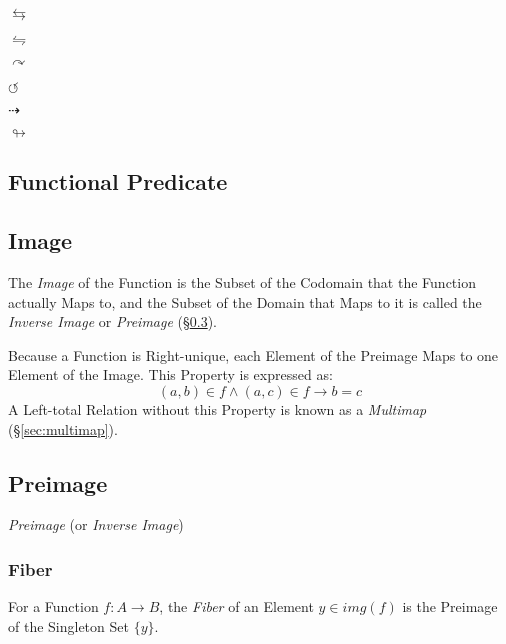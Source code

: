 $\leftrightarrows$

$\leftrightharpoons$

$\curvearrowright$

$\circlearrowleft$

$\dashrightarrow$

$\looparrowright$



\subsection{Functional Predicate}\label{sec:functional_predicate}

\subsection{Image}\label{sec:image}

The \emph{Image} of the Function is the Subset of the Codomain that
the Function actually Maps to, and the Subset of the Domain that Maps
to it is called the \emph{Inverse Image} or \emph{Preimage}
(\S\ref{sec:preimage}).

Because a Function is Right-unique, each Element of the Preimage Maps
to one Element of the Image. This Property is expressed as:
\[
  (a,b) \in f \wedge (a,c) \in f \rightarrow b = c
\]
A Left-total Relation without this Property is known as a
\emph{Multimap} (\S\ref{sec:multimap}).



\subsection{Preimage}\label{sec:preimage}

\emph{Preimage} (or \emph{Inverse Image})



\subsubsection{Fiber}\label{sec:fiber}

For a Function $f : A \rightarrow B$, the \emph{Fiber} of an Element
$y \in img(f)$ is the Preimage of the Singleton Set $\{y\}$.



